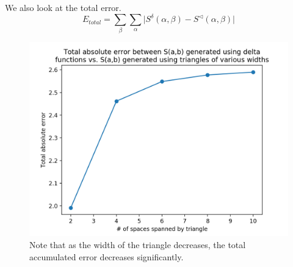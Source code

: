 \documentclass[10pt]{article}
\begin{document}
              
              We also look at the total error.
              \[E_{total}=\sum_{\beta}\sum_\alpha \Big|S^\delta(\alpha,\beta)-S^\triangleleft(\alpha,\beta)\Big|\]

            \begin{figure}[H]
              \begin{center}
              \includegraphics[scale=0.6]{diff_widths_total_error}
                \caption{Note that as the width of the triangle decreases, the total accumulated error decreases significantly.}
              \label{fig:diff_widths_total_error}
              \end{center}
            \end{figure}








            \clearpage

%  
%
\end{document}
